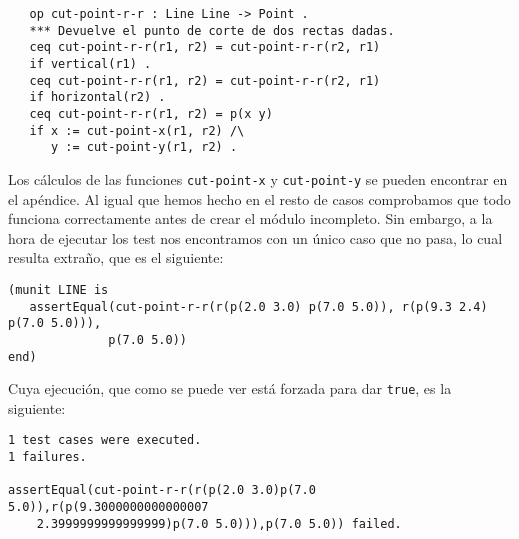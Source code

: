 {\codesize
\begin{verbatim}	
   op cut-point-r-r : Line Line -> Point .
   *** Devuelve el punto de corte de dos rectas dadas.
   ceq cut-point-r-r(r1, r2) = cut-point-r-r(r2, r1)
   if vertical(r1) .
   ceq cut-point-r-r(r1, r2) = cut-point-r-r(r2, r1)
   if horizontal(r2) .
   ceq cut-point-r-r(r1, r2) = p(x y)
   if x := cut-point-x(r1, r2) /\
      y := cut-point-y(r1, r2) .

\end{verbatim}
}

Los cálculos de las funciones \texttt{cut-point-x} y \texttt{cut-point-y} se pueden encontrar en el apéndice. Al igual que hemos hecho en el resto de casos comprobamos que todo funciona correctamente antes de crear el módulo incompleto. Sin embargo, a la hora de ejecutar los test nos encontramos con un único caso que no pasa, lo cual resulta extraño, que es el siguiente: \par

{\codesize
\begin{verbatim}
(munit LINE is
   assertEqual(cut-point-r-r(r(p(2.0 3.0) p(7.0 5.0)), r(p(9.3 2.4) p(7.0 5.0))),
              p(7.0 5.0))
end)
\end{verbatim}
}

Cuya ejecución, que como se puede ver está forzada para dar \texttt{true}, es la siguiente:\par

{\codesize
\begin{verbatim}
1 test cases were executed.
1 failures.

assertEqual(cut-point-r-r(r(p(2.0 3.0)p(7.0 5.0)),r(p(9.3000000000000007
    2.3999999999999999)p(7.0 5.0))),p(7.0 5.0)) failed.
\end{verbatim}
}

